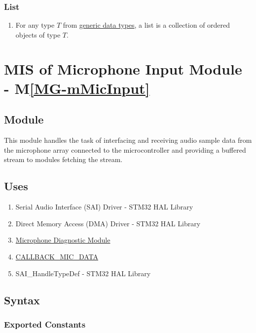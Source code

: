\documentclass[12pt, titlepage]{article}
\newcommand{\mref}[1]{M\ref{#1}}
\begin{document}
\subsubsection{List} \label{ds:list}
\begin{enumerate}
  \item For any type $T$ from \hyperref[sec:generics]{generic data types}, a
    list is a collection of ordered objects of type $T$.
\end{enumerate}


\newpage

\section{MIS of Microphone Input Module \label{mod:MicInput} -
\mref{MG-mMicInput}}

\subsection{Module}
This module handles the task of interfacing and receiving audio sample data from
the microphone array connected to the microcontroller and providing a buffered
stream to modules fetching the stream.

\subsection{Uses}
\begin{enumerate}
  \item Serial Audio Interface (SAI) Driver - STM32 HAL Library
  \cite{STM_USER_MANUAL}
  \item Direct Memory Access (DMA) Driver - STM32 HAL Library
  \cite{STM_USER_MANUAL}
  \item \hyperref[mod:MicDiag]{Microphone Diagnostic Module}
  \item \hyperref[ds:cb-mic-data]{CALLBACK\_MIC\_DATA} 
  \item SAI\_HandleTypeDef - STM32 HAL Library \cite{STM_USER_MANUAL}
\end{enumerate}

\subsection{Syntax}

\subsubsection{Exported Constants}
\end{document}

